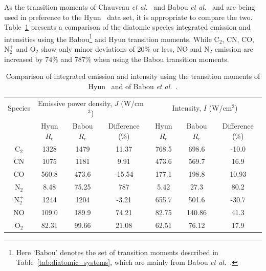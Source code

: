 As the transition moments of Chauveau \textit{et al.}~\cite{CPR+2002} and Babou \textit{et al.}~\cite{BRP+2009} and are being used in preference to the Hyun~\cite{hyun_phd} data set, it is appropriate to compare the two.
Table~\ref{tab:EM2C_diatom_compare} presents a comparison of the diatomic species integrated emission and intensities using the Babou\footnote{Here `Babou' denotes the set of transition moments described in Table~\ref{tab:diatomic_systems}, which are mainly from Babou \textit{et al.}~\cite{BRP+2009}.} and Hyun transition moments.
While C$_2$, CN, CO, N$_2^+$ and O$_2$ show only minor deviations of 20\% or less, NO and N$_2$ emission are increased by 74\% and 787\% when using the Babou transition moments.

\begin{table}[h]
 \small
 \center
 \caption{Comparison of integrated emission and intensity using the transition moments of Hyun~\cite{hyun_phd} and of Babou \textit{et al.}~\cite{BRP+2009}.}
 \label{tab:EM2C_diatom_compare}
 \begin{tabular*}{0.9\textwidth}{ccccccc}
  \hline Species                          & \multicolumn{3}{c}{Emissive power density, $J$ (W/cm$^3$)}        & \multicolumn{3}{c}{Intensity, $I$ (W/cm$^2$)}      \\
                                                      &  Hyun $R_e$  & Babou $R_e$ & Difference (\%)                     & Hyun $R_e$  & Babou $R_e$ & Difference (\%) \\
  \hline  
                  C$_2$                       & 1328                 &    1479       & 11.37                                     & 768.5      &    698.6    & -10.0 \\
                  CN                             & 1075                 &    1181       &  9.91                                       & 473.6      &    569.7   &  16.9 \\
                  CO                             & 560.8                &    473.6      & -15.54                                    & 177.1       &   198.8   & 10.93  \\
                  N$_2$                       & 8.48                  &    75.25      &  787                                         & 5.42        &    27.3   & 80.2 \\
                  N$_2^+$                  & 1244                 &    1204       & -3.21                                        &  655.7     &   501.6   & -30.7 \\
                  NO                             & 109.0                &    189.9     & 74.21                                       & 82.75     &   140.86 & 41.3 \\
                  O$_2$                      & 82.31                &    99.66      & 21.08                                        & 62.51    &     76.12    & 17.9 \\
  \hline
 \end{tabular*}
\end{table}

